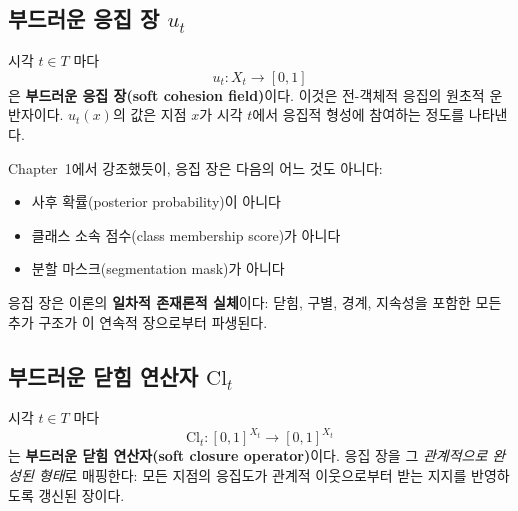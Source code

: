 \begin{center}
\end{center}


\subsection{부드러운 응집 장 $u_t$}

시각 $t \in T$ 마다
\begin{equation}
    u_t : X_t \to [0,1]
    \label{eq:cohesion-field}
\end{equation}
은 \textbf{부드러운 응집 장(soft cohesion field)}이다. 이것은 전-객체적 응집의 원초적 운반자이다. $u_t(x)$의 값은 지점 $x$가 시각 $t$에서 응집적 형성에 참여하는 정도를 나타낸다.

Chapter~1에서 강조했듯이, 응집 장은 다음의 어느 것도 아니다:
\begin{itemize}
    \item 사후 확률(posterior probability)이 아니다
    \item 클래스 소속 점수(class membership score)가 아니다
    \item 분할 마스크(segmentation mask)가 아니다
\end{itemize}
응집 장은 이론의 \textbf{일차적 존재론적 실체}이다: 닫힘, 구별, 경계, 지속성을 포함한 모든 추가 구조가 이 연속적 장으로부터 파생된다.


\subsection{부드러운 닫힘 연산자 $\mathrm{Cl}_t$}

시각 $t \in T$ 마다
\begin{equation}
    \mathrm{Cl}_t : [0,1]^{X_t} \to [0,1]^{X_t}
    \label{eq:closure-operator}
\end{equation}
는 \textbf{부드러운 닫힘 연산자(soft closure operator)}이다. 응집 장을 그 \emph{관계적으로 완성된 형태}로 매핑한다: 모든 지점의 응집도가 관계적 이웃으로부터 받는 지지를 반영하도록 갱신된 장이다.

